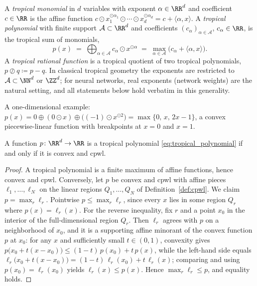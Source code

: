 \begin{definition}\label{def:tropical_polynomial}
A \emph{tropical monomial} in $d$ variables with exponent $\alpha \in \RR^{d}$ and coefficient $c \in \RR$ is the affine function $c \odot x_1^{\odot \alpha_1} \odot \cdots \odot x_d^{\odot \alpha_d} = c + \langle \alpha, x \rangle$. A \emph{tropical polynomial} with finite support $\mathcal{A} \subset \RR^{d}$ and coefficients $(c_{\alpha})_{\alpha \in \mathcal{A}}$, $c_\alpha \in \RR$, is the tropical sum of monomials,
\begin{equation}
	p(x) \;=\; \bigoplus_{\alpha \in \mathcal{A}} c_{\alpha} \odot x^{\odot \alpha}
	\;=\; \max_{\alpha \in \mathcal{A}} \bigl( c_{\alpha} + \langle \alpha, x \rangle \bigr).
	\label{eq:tropical_polynomial}
\end{equation}
A \emph{tropical rational function} is a tropical quotient of two tropical polynomials, $p \oslash q \coloneqq p - q$. In classical tropical geometry \parencite{MaclaganSturmfels2015tropical} the exponents are restricted to $\mathcal{A} \subset \NN^{d}$ or $\ZZ^{d}$; for neural networks, real exponents (network weights) are the natural setting, and all statements below hold verbatim in this generality.
\end{definition}

A one-dimensional example: $p(x) = 0 \oplus (0 \odot x) \oplus \bigl((-1) \odot x^{\odot 2}\bigr) = \max\{0,\, x,\, 2x - 1\}$, a convex piecewise-linear function with breakpoints at $x = 0$ and $x = 1$.

\begin{observation}\label{obs:tropical_convex_cpwl}
A function $p \colon \RR^d \to \RR$ is a tropical polynomial \eqref{eq:tropical_polynomial} if and only if it is convex and \ac{cpwl}.
\hfill{}
\end{observation}

\begin{proof}
A tropical polynomial is a finite maximum of affine functions, hence convex and \ac{cpwl}. Conversely, let $p$ be convex and \ac{cpwl} with affine pieces $\ell_1, \ldots, \ell_N$ on the linear regions $Q_1, \ldots, Q_N$ of Definition~\ref{def:cpwl}. We claim $p = \max_r \ell_r$. Pointwise $p \le \max_r \ell_r$, since every $x$ lies in some region $Q_r$ where $p(x) = \ell_r(x)$. For the reverse inequality, fix $r$ and a point $x_0$ in the interior of the full-dimensional region $Q_r$. Then $\ell_r$ agrees with $p$ on a neighborhood of $x_0$, and it is a supporting affine minorant of the convex function $p$ at $x_0$: for any $x$ and sufficiently small $t \in (0, 1)$, convexity gives $p\bigl(x_0 + t(x - x_0)\bigr) \le (1-t)\, p(x_0) + t\, p(x)$, while the left-hand side equals $\ell_r\bigl(x_0 + t(x-x_0)\bigr) = (1-t)\,\ell_r(x_0) + t\,\ell_r(x)$; comparing and using $p(x_0) = \ell_r(x_0)$ yields $\ell_r(x) \le p(x)$. Hence $\max_r \ell_r \le p$, and equality holds.
\end{proof}

